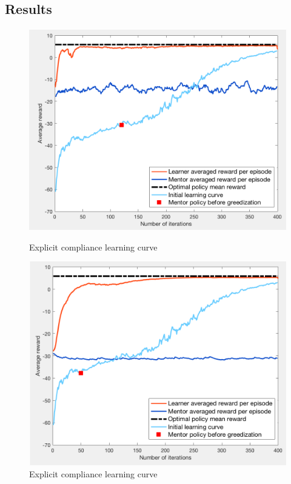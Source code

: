 \documentclass[a4paper]{report}
\begin{document}
{{{			\subsection{Results}
			{				 
				 \begin{figure}[ht!]
					\begin{minipage}{0.5\linewidth}
						\begin{center}
							\includegraphics[width=0.95\linewidth]{av_il_subopt_120}
							\caption{Explicit compliance learning curve}
							\label{fig::av_il_subopt_120}
						\end{center}
					\end{minipage}
					\begin{minipage}{0.5\linewidth}
						\begin{center}
							\includegraphics[width=0.95\linewidth]{av_il_subopt_50}
							\caption{Explicit compliance learning curve}
							\label{fig::av_il_subopt_50}
						\end{center}
					\end{minipage}
				\end{figure}
				
}}}}
\end{document}
